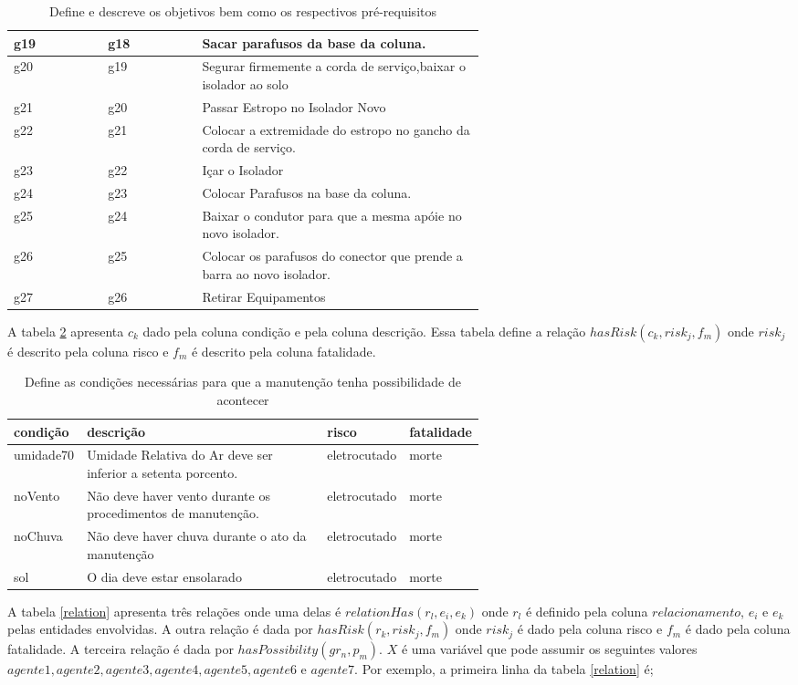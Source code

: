 \documentclass[12pt]{article}
\begin{document}
\begin{table}[H]
\begin{tabular}{|l|l|p{0.6\linewidth}|}
g19 &  g18 & Sacar parafusos da base da coluna. \\ \hline
g20 &  g19 & Segurar firmemente a corda de serviço,baixar o isolador ao solo \\ \hline
g21 &  g20 & Passar Estropo no Isolador Novo \\ \hline
g22 &  g21 & Colocar a extremidade do estropo no gancho da corda de serviço. \\ \hline
g23 &  g22 & Içar o Isolador \\ \hline
g24 &  g23 & Colocar Parafusos na base da coluna. \\ \hline
g25 &  g24 & Baixar o condutor para que a mesma apóie no novo isolador. \\ \hline
g26 &  g25 & Colocar os parafusos do conector que prende a barra ao novo isolador. \\ \hline
g27 &  g26 & Retirar Equipamentos \\ \hline
\end{tabular}
\caption{Define e descreve os objetivos bem como os respectivos pré-requisitos}
\label{g}
\end{table}

A tabela \ref{condition} apresenta $c_k$ dado pela coluna condição e pela coluna descrição. Essa tabela define a relação $hasRisk(c_k,risk_j,f_m)$ onde $risk_j$ é descrito pela coluna risco e $f_m$ é descrito pela coluna fatalidade. 

\begin{table}[H]
\centering
\begin{tabular}{|l|p{0.6\linewidth}|l|l|}
\hline
\textbf{condição} & \textbf{descrição} & \textbf{risco} & \textbf{fatalidade} \\ \hline
umidade70 & Umidade Relativa do Ar deve ser inferior a setenta porcento. & eletrocutado & morte \\ \hline
noVento & Não deve haver vento durante os procedimentos de manutenção. & eletrocutado & morte \\ \hline
noChuva & Não deve haver chuva durante o ato da manutenção & eletrocutado & morte \\ \hline
sol & O dia deve estar ensolarado & eletrocutado & morte \\ \hline
\end{tabular}
\caption{Define as condições necessárias para que a manutenção tenha possibilidade de acontecer}
\label{condition}
\end{table}


A tabela \ref{relation} apresenta três relações onde uma delas é $relationHas(r_l,e_i,e_k)$ onde $r_l$ é definido pela coluna $relacionamento$, $e_i$ e $e_k$ pelas entidades envolvidas. A outra relação é dada por $hasRisk(r_k,risk_j,f_m)$ onde $risk_j$ é dado pela coluna risco e $f_m$ é dado pela coluna fatalidade. A terceira relação é dada por $hasPossibility(gr_n,p_m)$. $X$ é uma variável que pode assumir os seguintes valores $agente1, agente2, agente3,agente4, agente5, agente6$ e $agente7$. Por exemplo, a primeira linha da tabela \ref{relation} é; 
\end{document}
